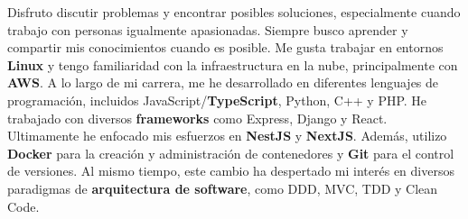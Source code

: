 

%
\begin{cventries}

\vspace{-3.5mm}  
\cventry
  {}
  {}
  {}
  {}
  {Disfruto discutir problemas y encontrar posibles soluciones, especialmente cuando trabajo con personas igualmente apasionadas. Siempre busco aprender y compartir mis conocimientos cuando es posible. Me gusta trabajar en entornos \textbf{Linux} y tengo familiaridad con la infraestructura en la nube, principalmente con \textbf{AWS}. A lo largo de mi carrera, me he desarrollado en diferentes lenguajes de programación, incluidos JavaScript/\textbf{TypeScript}, Python, C++ y PHP. He trabajado con diversos \textbf{frameworks} como Express, Django y React. Ultimamente he enfocado mis esfuerzos en \textbf{NestJS} y \textbf{NextJS}. Además, utilizo \textbf{Docker} para la creación y administración de contenedores y \textbf{Git} para el control de versiones. Al mismo tiempo, este cambio ha despertado mi interés en diversos paradigmas de \textbf{arquitectura de software}, como DDD, MVC, TDD y Clean Code.}
\end{cventries}